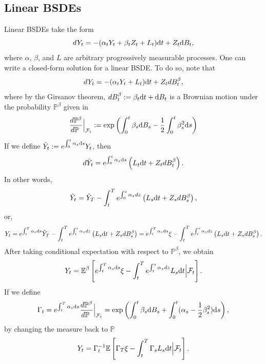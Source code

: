 \documentclass[11pt]{book}
\newcommand{\dd}{\text{\normalfont d}}
\newcommand{\dt}{\text{\normalfont d}t}
\newcommand{\ds}{\text{\normalfont d}s}
\begin{document}
\subsection{Linear BSDEs}
Linear BSDEs take the form
\begin{equation}\label{eqn:linear_BSDE}
dY_t=-(\alpha_tY_t+\beta_tZ_t+L_t){{\dt}}+Z_t{\dd}B_t,
\end{equation}
where $\alpha$, $\beta$, and $L$ are arbitrary progressively measurable processes.
One can write a closed-form solution for a linear BSDE. To do so, note that
\begin{equation}
	dY_t=-(\alpha_tY_t+L_t){{\dt}}+Z_tdB^{\beta}_t,
\end{equation}
where by the Girsanov theorem, $dB^{\beta}_t:=\beta_t{{\dt}}+{\dd}B_t$ is a Brownian motion under the probability $\mathbb{P}^{\beta}$ given in
\begin{equation}
	\frac{d\mathbb{P}^{\beta}}{d\mathbb{P}~}\Big|_{\mathcal{F}_t}:=\exp\left(
	\int_0^t\beta_s {\dd}B_s-\frac12\int_0^t\beta^2_s{{\ds}}
	\right)
\end{equation}
If we define $\tilde{Y}_t:=e^{\int_0^t \alpha_s{{\ds}}}Y_t$, then
\begin{equation}
	d\tilde{Y}_t=e^{\int_0^t \alpha_s {{\ds}}}\left(L_t{{\dt}}+Z_tdB^{\beta}_t\right).
\end{equation}
In other words,
\begin{equation}
	\tilde{Y}_t=\tilde{Y}_T-\int_{t}^{T} e^{\int_0^s \alpha_z dz}\left(L_s{{\dt}}+Z_sdB^{\beta}_s\right),
\end{equation}
or, 
\begin{equation}
	{Y}_t=e^{\int_t^T \alpha_s{{\ds}}}\tilde{Y}_T-\int_{t}^{T} e^{\int_t^s \alpha_z dz}\left(L_s{{\dt}}+Z_sdB^{\beta}_s\right)=e^{\int_t^T \alpha_s{{\ds}}}\xi-\int_{t}^{T} e^{\int_t^s \alpha_z dz}\left(L_s{{\dt}}+Z_sdB^{\beta}_s\right).
\end{equation}
After taking conditional expectation with respect to $\mathbb{P}^{\beta}$, we obtain
\begin{equation}
	Y_t=\mathbb{E}^{\beta}\left[e^{\int_t^T \alpha_s {{\ds}}}\xi-\int_{t}^{T} e^{\int_t^s \alpha_z dz}L_s{{\dt}}
	\Big|\mathcal{F}_t\right].
\end{equation}
If we define 
\begin{equation}
	\Gamma_t=e^{\int_t^T \alpha_s {{\ds}}}\frac{d\mathbb{P}^{\beta}}{d\mathbb{P}~}\Big|_{\mathcal{F}_t}=\exp\left(
	\int_0^t\beta_s {\dd}B_s+\int_0^t(\alpha_s-\frac12\beta^2_s){{\ds}}
	\right),
\end{equation}
by changing the measure back to $\mathbb{P}$
\begin{equation}
	Y_t=\Gamma^{-1}_t\mathbb{E}\left[\Gamma_{T} \xi-\int_{t}^{T} \Gamma_{s} L_s{{\dt}}
	\Big|\mathcal{F}_t\right].
\end{equation}
\end{document}
